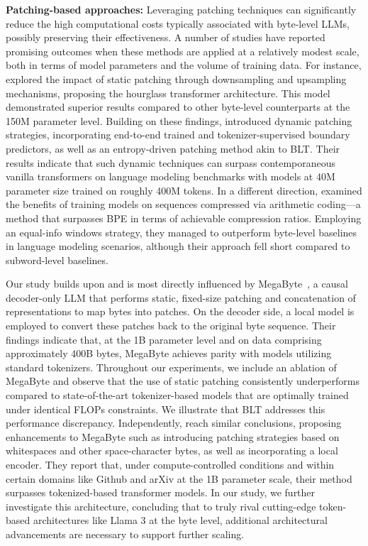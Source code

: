 \textbf{Patching-based approaches:} Leveraging patching techniques can significantly reduce the high computational costs typically associated with byte-level LLMs, possibly preserving their effectiveness. A number of studies have reported promising outcomes when these methods are applied at a relatively modest scale, both in terms of model parameters and the volume of training data. For instance, \cite{nawrot-etal-2022-hierarchical} explored the impact of static patching through downsampling and upsampling mechanisms, proposing the hourglass transformer architecture. This model demonstrated superior results compared to other byte-level counterparts at the 150M parameter level. Building on these findings, \cite{nawrot-etal-2023-efficient} introduced dynamic patching strategies, incorporating end-to-end trained and tokenizer-supervised boundary predictors, as well as an entropy-driven patching method akin to {\textsc BLT}. Their results indicate that such dynamic techniques can surpass contemporaneous vanilla transformers on language modeling benchmarks with models at 40M parameter size trained on roughly 400M tokens. In a different direction, \cite{lester2024training} examined the benefits of training models on sequences compressed via arithmetic coding—a method that surpasses BPE in terms of achievable compression ratios. Employing an equal-info windows strategy, they managed to outperform byte-level baselines in language modeling scenarios, although their approach fell short compared to subword-level baselines.

Our study builds upon and is most directly influenced by MegaByte~\citep{yu2023megabyte}, a causal decoder-only LLM that performs static, fixed-size patching and concatenation of representations to map bytes into patches. On the decoder side, a local model is employed to convert these patches back to the original byte sequence. Their findings indicate that, at the 1B parameter level and on data comprising approximately 400B bytes, MegaByte achieves parity with models utilizing standard tokenizers. Throughout our experiments, we include an ablation of MegaByte and observe that the use of static patching consistently underperforms compared to state-of-the-art tokenizer-based models that are optimally trained under identical FLOPs constraints. We illustrate that {\textsc BLT} addresses this performance discrepancy. Independently, \cite{slagle2024spacebyte} reach similar conclusions, proposing enhancements to MegaByte such as introducing patching strategies based on whitespaces and other space-character bytes, as well as incorporating a local encoder. They report that, under compute-controlled conditions and within certain domains like Github and arXiv at the 1B parameter scale, their method surpasses tokenized-based transformer models. In our study, we further investigate this architecture, concluding that to truly rival cutting-edge token-based architectures like Llama 3 at the byte level, additional architectural advancements are necessary to support further scaling.

